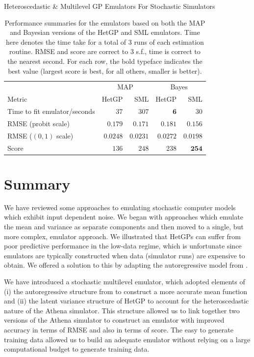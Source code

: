\begin{chapter}{Heteroscedastic \& Multilevel GP Emulators For Stochastic Simulators\label{Ch:Hetsml}}
\begin{table}
\begin{tabular}{lrrrr}
		& \multicolumn{2}{c}{MAP} & \multicolumn{2}{c}{Bayes}\\
		Metric & HetGP & SML & HetGP & SML \\ \cmidrule{1-5}
		Time to fit emulator/seconds &$37$&$307$&$\bm{6}$&$30$\\
		RMSE (probit scale)& $0.179$ & $0.171$&$0.181$&$\bm{0.156}$\\
		RMSE ($(0,1)$ scale) &$0.0248$&$0.0231$&$0.0272$&$\bm{0.0198}$\\
		Score &$136$&$248$&$238$&$\bm{254}$\\\bottomrule
	\end{tabular}
	\caption{Performance summaries for the emulators based on both the MAP and Bayesian versions of the HetGP and SML emulators. Time here denotes the time take for a total of 3 runs of each estimation routine. RMSE and score are correct to $3$ s.f., time is correct to the nearest second. For each row, the bold typeface indicates the best value (largest score is best, for all others, smaller is better).}
	\label{Tab:all-performance}
\end{table}
\section{Summary}
We have reviewed some approaches to emulating stochastic computer models which exhibit input dependent noise. We began with approaches which emulate the mean and variance as separate components and then moved to a single, but more complex, emulator approach. We illustrated that HetGPs can suffer from poor predictive performance in the low-data regime, which is unfortunate since emulators are typically constructed when data (simulator runs) are expensive to obtain. We offered a solution to this by adapting the autoregressive model from \citet{Kennedy2000}.

We have introduced a stochastic multilevel emulator, which adopted elements of (i) the autoregressive structure from \cite{Kennedy2000} to construct a more accurate mean function and (ii) the latent variance structure of HetGP \citep{Goldberg1998, Binois2018} to account for the heteroscedastic nature of the Athena simulator. This structure allowed us to link together two versions of the Athena simulator to construct an emulator with improved accuracy in terms of RMSE and also in terms of score. The easy to generate training data allowed us to build an adequate emulator without relying on a large computational budget to generate training data.


\end{chapter}
